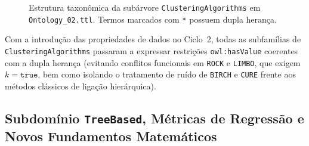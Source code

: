 \documentclass[11pt,a4paper]{article}
\newcommand{\onto}[1]{\texttt{#1}}
\begin{document}
\begin{figure}[htbp]
\caption{Estrutura taxonômica da subárvore \onto{ClusteringAlgorithms} em \texttt{Ontology\_02.ttl}. Termos marcados com \texttt{*} possuem dupla herança.}
\label{fig:clustering}
\end{figure}

Com a introdução das propriedades de dados no Ciclo~2, todas as subfamílias de \onto{ClusteringAlgorithms} passaram a expressar restrições \onto{owl:hasValue} coerentes com a dupla herança (evitando conflitos funcionais em \onto{ROCK} e \onto{LIMBO}, que exigem $k=\onto{true}$, bem como isolando o tratamento de ruído de \onto{BIRCH} e \onto{CURE} frente aos métodos clássicos de ligação hierárquica).

\subsection{Subdomínio \onto{TreeBased}, Métricas de Regressão e Novos Fundamentos Matemáticos}
\end{document}
